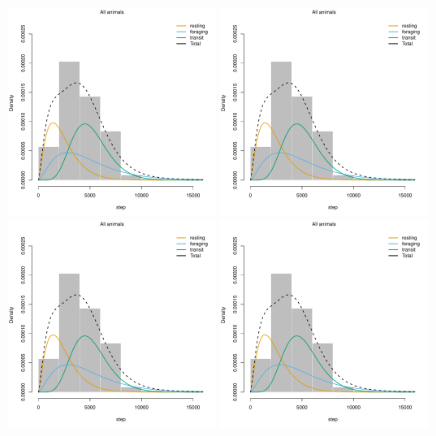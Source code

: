 \documentclass[12pt]{article}\usepackage[]{graphicx}\usepackage[]{xcolor}
\begin{document}
\begin{figure}[htbp]
  \includegraphics[width=0.49\textwidth,page=1]{plot_nfsResults}
  \includegraphics[width=0.49\textwidth,page=2]{plot_nfsResults}
  \includegraphics[width=0.49\textwidth,page=3]{plot_nfsResults}
  \includegraphics[width=0.49\textwidth,page=4]{plot_nfsResults}

\end{figure}
\end{document}
